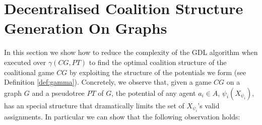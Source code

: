 \documentclass{aamas2012}
\begin{document}
\vspace{-0.1in}\section{Decentralised Coalition Structure Generation On Graphs}
\label{sec:csg_on_graphs}



\noindent In this section we show how to reduce the complexity of the GDL
algorithm when executed over $\gamma(CG, PT)$ to find the optimal coalition structure of the
coalitional game $CG$ by exploiting the structure of the potentials we form (see Definition \ref{def:gamma}). 
Concretely, we observe that, given a game $CG$ on a graph $G$ and a
pseudotree $PT$ of $G$, the potential of any agent $a_i\in A$,
$\psi_i(X_{\psi_i})$, has an special structure that dramatically limits the set
of $X_{\psi_i}$'s valid assignments. In particular we can show that the following observation holds:
\end{document}
